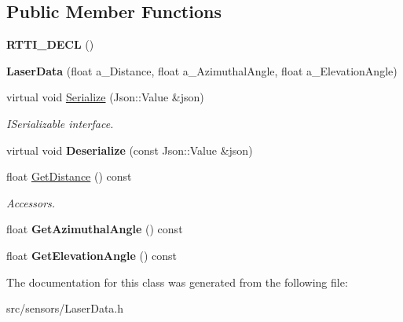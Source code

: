 \subsection*{Public Member Functions}
\begin{DoxyCompactItemize}
\item 
\mbox{\label{class_laser_data_a24f6626b30977639438af7d35a21eded}} 
{\bfseries R\+T\+T\+I\+\_\+\+D\+E\+CL} ()
\item 
\mbox{\label{class_laser_data_a4303fb40b1c8408b855a369c8aaf0178}} 
{\bfseries Laser\+Data} (float a\+\_\+\+Distance, float a\+\_\+\+Azimuthal\+Angle, float a\+\_\+\+Elevation\+Angle)
\item 
\mbox{\label{class_laser_data_a7c26a10fa8efbe54ec22d03ffb302ea8}} 
virtual void \hyperlink{class_laser_data_a7c26a10fa8efbe54ec22d03ffb302ea8}{Serialize} (Json\+::\+Value \&json)
\begin{DoxyCompactList}\small\item\em I\+Serializable interface. \end{DoxyCompactList}\item 
\mbox{\label{class_laser_data_a0ff95db14f3c5af3ed18cbaea520108b}} 
virtual void {\bfseries Deserialize} (const Json\+::\+Value \&json)
\item 
\mbox{\label{class_laser_data_ae23c34ee8317c20797bfcbfa1d0ccf69}} 
float \hyperlink{class_laser_data_ae23c34ee8317c20797bfcbfa1d0ccf69}{Get\+Distance} () const
\begin{DoxyCompactList}\small\item\em Accessors. \end{DoxyCompactList}\item 
\mbox{\label{class_laser_data_ad39979d41eddbc37d390102830f84b8d}} 
float {\bfseries Get\+Azimuthal\+Angle} () const
\item 
\mbox{\label{class_laser_data_a55b97cc2311d001a51387c4511d23429}} 
float {\bfseries Get\+Elevation\+Angle} () const
\end{DoxyCompactItemize}


The documentation for this class was generated from the following file\+:\begin{DoxyCompactItemize}
\item 
src/sensors/Laser\+Data.\+h\end{DoxyCompactItemize}
